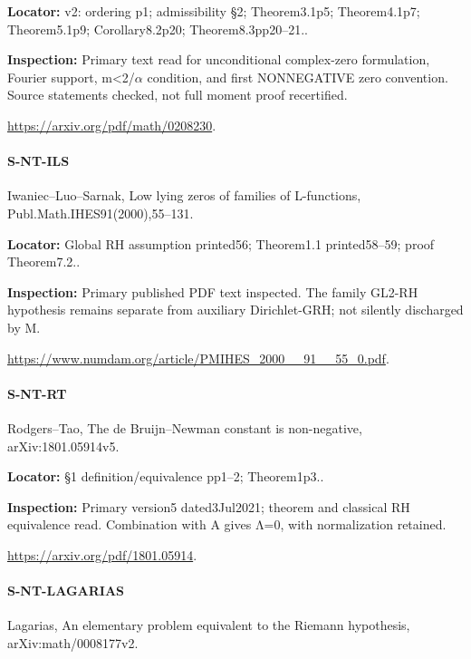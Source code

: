 \documentclass[11pt,a4paper]{article}
\begin{document}
\textbf{Locator:} v2:\allowbreak{} ordering p1; admissibility §2; Theorem3.\allowbreak{}1p5; Theorem4.\allowbreak{}1p7; Theorem5.\allowbreak{}1p9; Corollary8.\allowbreak{}2p20; Theorem8.\allowbreak{}3pp20–\allowbreak{}21.\allowbreak{}.

\textbf{Inspection:} Primary text read for unconditional complex-zero formulation, Fourier support, m<2/\allowbreak{}\ensuremath{\alpha} condition, and first NONNEGATIVE zero convention.\allowbreak{} Source statements checked, not full moment proof recertified.\allowbreak{}

\url{https://arxiv.org/pdf/math/0208230}.

\paragraph{S-NT-ILS} Iwaniec–\allowbreak{}Luo–\allowbreak{}Sarnak, Low lying zeros of families of L-functions, Publ.\allowbreak{}Math.\allowbreak{}IHES91(2000),55–\allowbreak{}131.

\textbf{Locator:} Global RH assumption printed56; Theorem1.\allowbreak{}1 printed58–\allowbreak{}59; proof Theorem7.\allowbreak{}2.\allowbreak{}.

\textbf{Inspection:} Primary published PDF text inspected.\allowbreak{} The family GL2-RH hypothesis remains separate from auxiliary Dirichlet-GRH; not silently discharged by M.\allowbreak{}

\url{https://www.numdam.org/article/PMIHES_2000__91__55_0.pdf}.

\paragraph{S-NT-RT} Rodgers–\allowbreak{}Tao, The de Bruijn–\allowbreak{}Newman constant is non-negative, arXiv:\allowbreak{}1801.\allowbreak{}05914v5.

\textbf{Locator:} §1 definition/\allowbreak{}equivalence pp1–\allowbreak{}2; Theorem1p3.\allowbreak{}.

\textbf{Inspection:} Primary version5 dated3Jul2021; theorem and classical RH equivalence read.\allowbreak{} Combination with A gives Λ=0, with normalization retained.\allowbreak{}

\url{https://arxiv.org/pdf/1801.05914}.

\paragraph{S-NT-LAGARIAS} Lagarias, An elementary problem equivalent to the Riemann hypothesis, arXiv:\allowbreak{}math/\allowbreak{}0008177v2.
\end{document}
